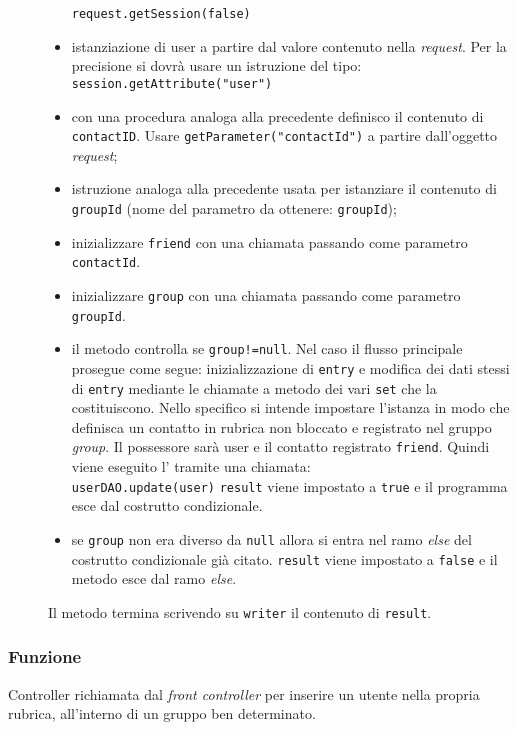 \begin{description}
\begin{itemize}
		\verb|request.getSession(false)|
		\item istanziazione di user a partire dal valore contenuto nella \textit{request}. Per la precisione si dovrà usare un istruzione del tipo:\\
		\verb|session.getAttribute("user")|
		\item con una procedura analoga alla precedente definisco il contenuto di \texttt{contactID}. Usare \verb|getParameter("contactId")| a partire dall'oggetto \textit{request};
		\item istruzione analoga alla precedente usata per istanziare il contenuto di \texttt{groupId} (nome del parametro da ottenere: \texttt{groupId});
		\item inizializzare \texttt{friend} con una chiamata  passando come parametro \texttt{contactId}.
		\item inizializzare \texttt{group} con una chiamata  passando come parametro \texttt{groupId}.
		\item il metodo controlla se \texttt{group!=null}. Nel caso il flusso principale prosegue come segue: inizializzazione di \texttt{entry} e modifica dei dati stessi di \texttt{entry} mediante le chiamate a metodo dei vari \texttt{set} che la costituiscono. Nello specifico si intende impostare l'istanza in modo che definisca un contatto in rubrica non bloccato e registrato nel gruppo \textit{group}. Il possessore sarà user e il contatto registrato \texttt{friend}. Quindi viene eseguito l' tramite una chiamata:\\
		\verb|userDAO.update(user)|
		\texttt{result} viene impostato a \texttt{true} e il programma esce dal costrutto condizionale.
		\item se \texttt{group} non era diverso da \texttt{null} allora si entra nel ramo \textit{else} del costrutto condizionale già citato. \texttt{result} viene impostato a \texttt{false} e il metodo esce dal ramo \textit{else}.
	\end{itemize}
	Il metodo termina scrivendo su \texttt{writer} il contenuto di \texttt{result}.
	
\end{description}



\subsubsection*{Funzione}
Controller richiamata dal \textit{front controller} per inserire un utente nella propria rubrica, all'interno di un gruppo ben determinato.

